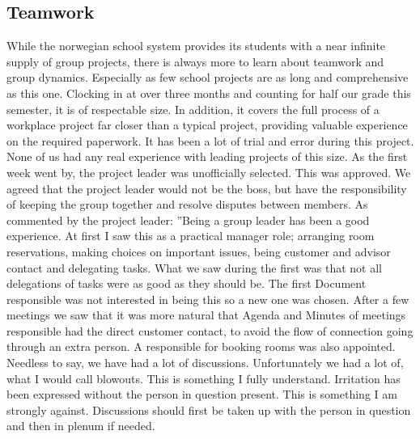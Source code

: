 \subsection{Teamwork}
While the norwegian school system provides its students with a near infinite supply of group projects, there is always more to learn about teamwork and group dynamics. Especially as few school projects are as long and comprehensive as this one. Clocking in at over three months and counting for half our grade this semester, it is of respectable size. In addition, it covers the full process of a workplace project far closer than a typical project, providing valuable experience on the required paperwork.
\newline
\newline
It has been a lot of trial and error during this project. None of us had any real experience with leading projects of this size. As the first week went by, the project leader was unofficially selected. This was approved. We agreed that the project leader would not be the boss, but have the responsibility of keeping the group together and resolve disputes between members. As commented by the project leader:
\newline
\newline
''Being a group leader has been a good experience. At first I saw this as a practical manager role; arranging room reservations, making choices on important issues, being customer and advisor contact and delegating tasks.
\newline 
\newline
What we saw during the first was that not all delegations of tasks were as good as they should be. The first Document responsible was not interested in being this so a new one was chosen.
\newline 
\newline
After a few meetings we saw that it was more natural that Agenda and Minutes of meetings responsible had the direct customer contact, to avoid the flow of connection going through an extra person. A responsible for booking rooms was also appointed.
\newline
\newline
Needless to say, we have had a lot of discussions. Unfortunately we had a lot of, what I would call blowouts. This is something I fully understand. Irritation has been expressed without the person in question present. This is something I am strongly against. Discussions should first be taken up with the person in question and then in plenum if needed.
